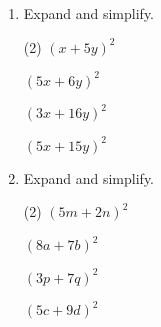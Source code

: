 \begin{enumerate} [leftmargin=0cm]
\item Expand and simplify.
\begin{tasks}[label=(\arabic*), after-item-skip=2pt,after-skip=3pt, label-width=4ex](2)
    \task  $ ( x+ 5y)^2  $    \\  \begin{envAnswer} { }\end{envAnswer}
    \task  $ (5x+ 6y)^2  $    \\  \begin{envAnswer} { }\end{envAnswer}
    \task  $ (3x+16y)^2  $    \\  \begin{envAnswer} { }\end{envAnswer}
    \task  $ (5x+15y)^2  $    \\  \begin{envAnswer} { }\end{envAnswer}
\end{tasks}


\item Expand and simplify.
\begin{tasks}[label=(\arabic*), after-item-skip=2pt,after-skip=3pt, label-width=4ex](2)
    \task  $ (5m+ 2n)^2  $    \\  \begin{envAnswer} { }\end{envAnswer}
    \task  $ (8a+ 7b)^2  $    \\  \begin{envAnswer} { }\end{envAnswer}
    \task  $ (3p+ 7q)^2  $    \\  \begin{envAnswer} { }\end{envAnswer}
    \task  $ (5c+ 9d)^2  $    \\  \begin{envAnswer} { }\end{envAnswer}
\end{tasks}






\end{enumerate}
